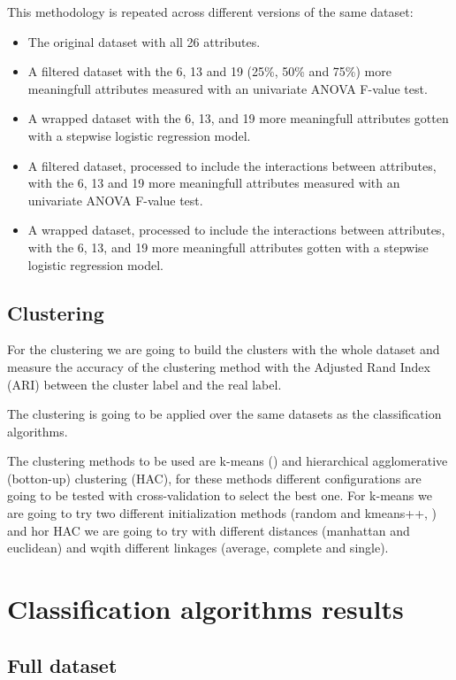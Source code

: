 \documentclass[a4paper,11pt]{article}
\begin{document}
This methodology is repeated across different versions of the same dataset:

\begin{itemize}
	\item The original dataset with all 26 attributes.
	\item A filtered dataset with the 6, 13 and 19 (25\%, 50\% and 75\%) more meaningfull attributes measured with an univariate ANOVA F-value test.
	\item A wrapped dataset with the 6, 13, and 19 more meaningfull attributes gotten with a stepwise logistic regression model.
	\item A filtered dataset, processed to include the interactions between attributes, with the 6, 13 and 19 more meaningfull attributes  measured with an univariate ANOVA F-value test.
	\item A wrapped dataset, processed to include the interactions between attributes, with the 6, 13, and 19 more meaningfull attributes gotten with a stepwise logistic regression model.
\end{itemize}

\subsection{Clustering}

For the clustering we are going to build the clusters with the whole dataset and measure the accuracy of the clustering method with the Adjusted Rand Index (ARI) between the cluster label and the real label.

The clustering is going to be applied over the same datasets as the classification algorithms.

The clustering methods to be used are k-means (\cite{forgy1968}) and hierarchical agglomerative (botton-up) clustering (HAC), for these methods different configurations are going to be tested with cross-validation to select the best one. For k-means we are going to try two different initialization methods (random and kmeans++, \cite{arthur2007}) and hor HAC we are going to try with different distances (manhattan and euclidean) and wqith different linkages (average, complete and single).

\section{Classification algorithms results}

\subsection{Full dataset}
\end{document}
